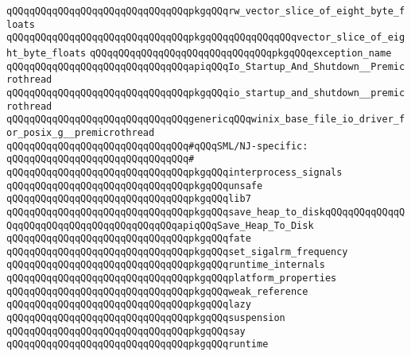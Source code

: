 \verb|qQQqqQQqqQQqqQQqqQQqqQQqqQQqqQQqpkgqQQqrw_vector_slice_of_eight_byte_floats|\newline
\verb|qQQqqQQqqQQqqQQqqQQqqQQqqQQqqQQqpkgqQQqqQQqqQQqqQQqvector_slice_of_eight_byte_floats|\newline
\verb|qQQqqQQqqQQqqQQqqQQqqQQqqQQqqQQqpkgqQQqexception_name|\newline
\newline
\verb|qQQqqQQqqQQqqQQqqQQqqQQqqQQqqQQqapiqQQqIo_Startup_And_Shutdown__Premicrothread|\newline
\verb|qQQqqQQqqQQqqQQqqQQqqQQqqQQqqQQqpkgqQQqio_startup_and_shutdown__premicrothread|\newline
\newline
\verb|qQQqqQQqqQQqqQQqqQQqqQQqqQQqqQQqgenericqQQqwinix_base_file_io_driver_for_posix_g__premicrothread|\newline
\newline
\verb|qQQqqQQqqQQqqQQqqQQqqQQqqQQqqQQq#qQQqSML/NJ-specific:|\newline
\verb|qQQqqQQqqQQqqQQqqQQqqQQqqQQqqQQq#|\newline
\verb|qQQqqQQqqQQqqQQqqQQqqQQqqQQqqQQqpkgqQQqinterprocess_signals|\newline
\verb|qQQqqQQqqQQqqQQqqQQqqQQqqQQqqQQqpkgqQQqunsafe|\newline
\verb|qQQqqQQqqQQqqQQqqQQqqQQqqQQqqQQqpkgqQQqlib7|\newline
\verb|qQQqqQQqqQQqqQQqqQQqqQQqqQQqqQQqpkgqQQqsave_heap_to_diskqQQqqQQqqQQqqQQqqQQqqQQqqQQqqQQqqQQqqQQqqQQqapiqQQqSave_Heap_To_Disk|\newline
\verb|qQQqqQQqqQQqqQQqqQQqqQQqqQQqqQQqpkgqQQqfate|\newline
\verb|qQQqqQQqqQQqqQQqqQQqqQQqqQQqqQQqpkgqQQqset_sigalrm_frequency|\newline
\verb|qQQqqQQqqQQqqQQqqQQqqQQqqQQqqQQqpkgqQQqruntime_internals|\newline
\verb|qQQqqQQqqQQqqQQqqQQqqQQqqQQqqQQqpkgqQQqplatform_properties|\newline
\verb|qQQqqQQqqQQqqQQqqQQqqQQqqQQqqQQqpkgqQQqweak_reference|\newline
\verb|qQQqqQQqqQQqqQQqqQQqqQQqqQQqqQQqpkgqQQqlazy|\newline
\verb|qQQqqQQqqQQqqQQqqQQqqQQqqQQqqQQqpkgqQQqsuspension|\newline
\verb|qQQqqQQqqQQqqQQqqQQqqQQqqQQqqQQqpkgqQQqsay|\newline
\newline
\verb|qQQqqQQqqQQqqQQqqQQqqQQqqQQqqQQqpkgqQQqruntime|\newline
